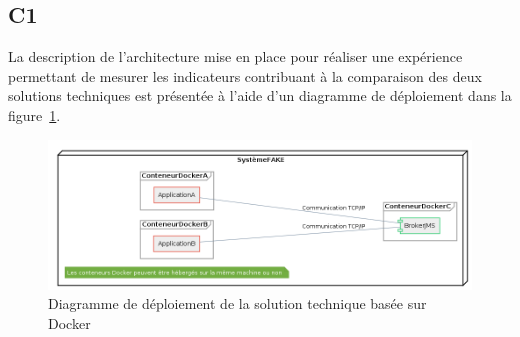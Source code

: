 \subsection{C1}
    La description de l'architecture mise en place pour réaliser une expérience permettant de mesurer les indicateurs contribuant à la comparaison des deux solutions techniques est présentée à l'aide d'un diagramme de déploiement dans la figure~\ref{fig:deploiement-docker}.

    \begin{figure}[H]
        \centering
        \includegraphics[width=\textwidth]{images/C1.png}
        \caption{Diagramme de déploiement de la solution technique basée sur Docker}
        \label{fig:deploiement-docker}
    \end{figure}
